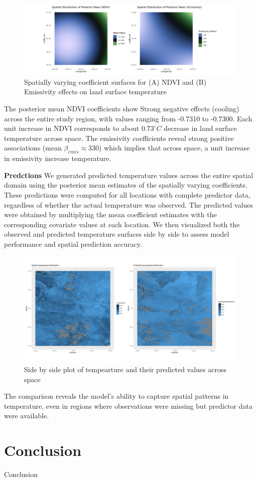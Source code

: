 \begin{figure}[h]
 \centering
 \includegraphics[width=\textwidth]{../../figures/model_means.png}
 \caption{Spatially varying coefficient surfaces for (A) NDVI and (B) Emissivity effects on land surface temperature}
 \label{fig:posterior means}
 \end{figure}
 The posterior mean NDVI coefficients show Strong negative effects (cooling) across the entire study region, with values ranging from -0.7310 to -0.7300. 
 Each unit increase in NDVI corresponds to about $0.73^\circ C$ decrease in land surface temperature across space.
 The emissivity coefficients reveal strong positive associations (mean $\beta_{emis} \approx 330$) which implies that across space, a unit increase in emissivity increase temperature.\newline
 
 
 \textbf{Predctions} \newline
 We generated predicted temperature values across the entire spatial domain using the posterior mean estimates of the spatially varying coefficients. 
 These predictions were computed for all locations with complete predictor data, regardless of whether the actual temperature was observed. 
 The predicted values were obtained by multiplying the mean coefficient estimates with the corresponding covariate values at each location. 
 We then visualized both the observed and predicted temperature surfaces side by side to assess model performance and spatial prediction accuracy. 
 
 
 \begin{figure}[h]
 \centering
 \includegraphics[width=\textwidth]{../../figures/predictions.png}
 \caption{Side by side plot of tempearture and their predicted values across space}
 \label{fig:predicted temperature}
 \end{figure}
 
 The comparison reveals the model’s ability to capture spatial patterns in temperature, even in regions where observations were missing but predictor data were available.
 
 
\section{Conclusion}
Conclusion 






